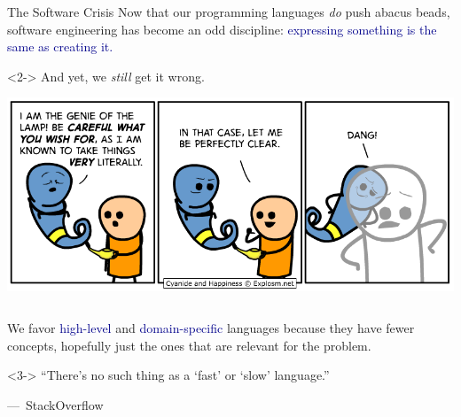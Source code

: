 \documentclass[aspectratio=169]{beamer}
\begin{document}
\begin{frame}{The Software Crisis}
\large
\vspace{1 cm}
Now that our programming languages {\it do} push abacus beads, software engineering has become an odd discipline: \textcolor{darkblue}{expressing something is the same as creating it.}

\vspace{1 cm}
\begin{uncoverenv}<2->
And yet, we {\it still} get it wrong.

\vspace{0.25 cm}
\begin{center}
\includegraphics[width=0.6\linewidth]{literal-genie.png}
\end{center}
\end{uncoverenv}
\end{frame}

\begin{frame}{}
\large
\vspace{1.5 cm}
\begin{columns}
\begin{center}
We favor \textcolor{darkblue}{high-level} and \textcolor{darkblue}{domain-specific} languages because they have fewer concepts, hopefully just the ones that are relevant for the problem.

\vspace{1 cm}

\vspace{1 cm}
\begin{uncoverenv}<3->
``There's no such thing as a `fast' or `slow' language.''

\vspace{0.2 cm}
\hfill\mbox{--- StackOverflow\hspace{2 cm}}
\end{uncoverenv}
\end{center}
\end{columns}
\end{frame}
\end{document}
